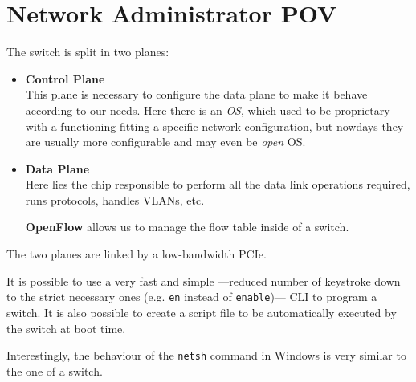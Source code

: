 \section{Network Administrator POV}
The switch is split in two planes:
\begin{itemize}
   \item \textbf{Control Plane}\\
   This plane is necessary to configure the data plane to make it behave according to our needs.
   Here there is an \textit{OS}, which used to be proprietary with a functioning fitting a specific network configuration, but nowdays they are usually more configurable and may even be \textit{open} OS.
   
   \item \textbf{Data Plane}\\
   Here lies the chip responsible to perform all the data link operations required, runs protocols, handles VLANs, etc.

   \textbf{OpenFlow} allows us to manage the flow table inside of a switch.
\end{itemize}

The two planes are linked by a low-bandwidth PCIe.


It is possible to use a very fast and simple ---reduced number of keystroke down to the strict necessary ones (e.g. \texttt{en} instead of \texttt{enable})--- CLI to program a switch. It is also possible to create a script file to be automatically executed by the switch at boot time.

Interestingly, the behaviour of the \texttt{netsh} command in Windows is very similar to the one of a switch.
